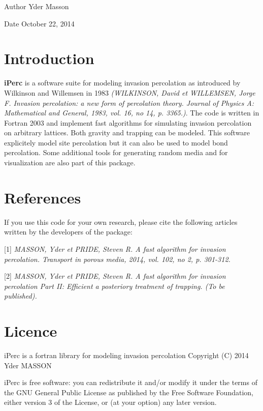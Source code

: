 \begin{DoxyAuthor}{\-Author}
\-Yder \-Masson 
\end{DoxyAuthor}
\begin{DoxyDate}{\-Date}
\-October 22, 2014 
\end{DoxyDate}
\hypertarget{index_intro_sec}{}\section{\-Introduction}\label{index_intro_sec}
{\bfseries i\-Perc} is a software suite for modeling invasion percolation as introduced by \-Wilkinson and \-Willemsen in 1983 {\itshape (\-W\-I\-L\-K\-I\-N\-S\-O\-N, \-David et \-W\-I\-L\-L\-E\-M\-S\-E\-N, \-Jorge \-F. \-Invasion percolation\-: a new form of percolation theory. \-Journal of \-Physics \-A\-: \-Mathematical and \-General, 1983, vol. 16, no 14, p. 3365.)\/}. \-The code is written in \-Fortran 2003 and implement fast algorithms for simulating invasion percolation on arbitrary lattices. \-Both gravity and trapping can be modeled. \-This software explicitely model site percolation but it can also be used to model bond percolation. \-Some additional tools for generating random media and for visualization are also part of this package.\hypertarget{index_ref_sec}{}\section{\-References}\label{index_ref_sec}
\-If you use this code for your own research, please cite the following articles written by the developers of the package\-:

\mbox{[}1\mbox{]} {\itshape \-M\-A\-S\-S\-O\-N, \-Yder et \-P\-R\-I\-D\-E, \-Steven \-R. \-A fast algorithm for invasion percolation. \-Transport in porous media, 2014, vol. 102, no 2, p. 301-\/312.\/} \par
 \par
 \mbox{[}2\mbox{]} {\itshape \-M\-A\-S\-S\-O\-N, \-Yder et \-P\-R\-I\-D\-E, \-Steven \-R. \-A fast algorithm for invasion percolation \-Part \-I\-I\-: \-Efficient a posteriory treatment of trapping. (\-To be published).\/}\hypertarget{index_licence_sec}{}\section{\-Licence}\label{index_licence_sec}
i\-Perc is a fortran library for modeling invasion percolation \-Copyright (\-C) 2014 \-Yder \-M\-A\-S\-S\-O\-N

\par
 i\-Perc is free software\-: you can redistribute it and/or modify it under the terms of the \-G\-N\-U \-General \-Public \-License as published by the \-Free \-Software \-Foundation, either version 3 of the \-License, or (at your option) any later version.

